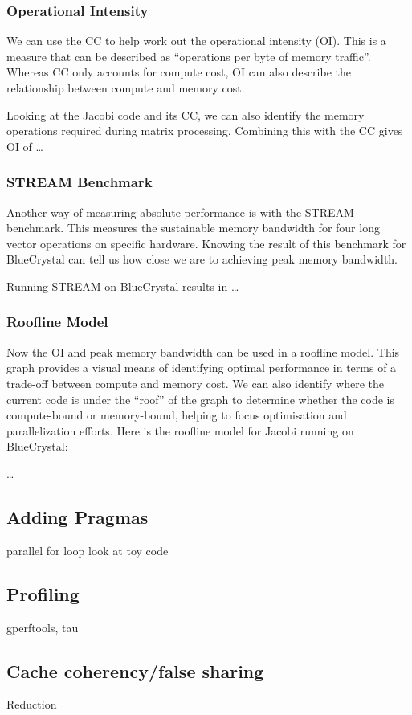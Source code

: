 \documentclass{article}
\begin{document}
\subsubsection{Operational Intensity}
We can use the CC to help work out the operational intensity
(OI). This is a measure that can be described as ``operations per byte
of memory traffic''. Whereas CC only accounts for compute cost, OI can
also describe the relationship between compute and memory cost.

Looking at the Jacobi code and its CC, we can also identify the memory
operations required during matrix processing. Combining this with the
CC gives OI of \ldots

\subsubsection{STREAM Benchmark}
Another way of measuring absolute performance is with the STREAM
benchmark. This measures the sustainable memory bandwidth for four
long vector operations on specific hardware. Knowing the result of
this benchmark for BlueCrystal can tell us how close we are to
achieving peak memory bandwidth.

Running STREAM on BlueCrystal results in \ldots

\subsubsection{Roofline Model}
Now the OI and peak memory bandwidth can be used in a roofline
model. This graph provides a visual means of identifying optimal
performance in terms of a trade-off between compute and memory
cost. We can also identify where the current code is under the
``roof'' of the graph to determine whether the code is compute-bound
or memory-bound, helping to focus optimisation and parallelization
efforts. Here is the roofline model for Jacobi running on BlueCrystal:

\ldots

\subsection{Adding Pragmas}
parallel for loop
look at toy code

\subsection{Profiling}
gperftools, tau

\subsection{Cache coherency/false sharing}
Reduction
\end{document}
